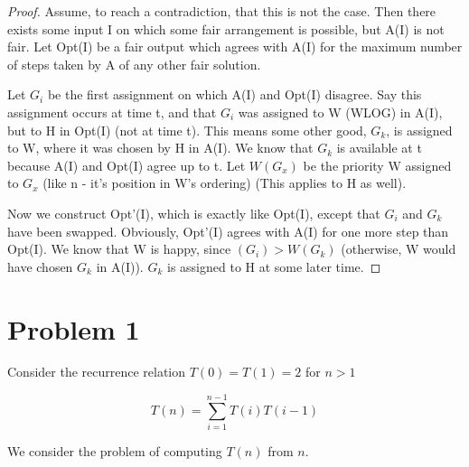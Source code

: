 \documentclass{article}
\providecommand{\prob}[1]{\section*{Problem #1}}
\begin{document}
	\begin{proof}
		Assume, to reach a contradiction, that this is not the case.
		Then there exists some input I on which some fair arrangement is possible, but A(I) is not fair.
		Let Opt(I) be a fair output which agrees with A(I) for the maximum number of steps taken by A of any other fair solution.
		
		Let $G_i$ be the first assignment on which A(I) and Opt(I) disagree.
		Say this assignment occurs at time t, and that $G_i$ was assigned to W (WLOG) in A(I), but to H in Opt(I) (not at time t).
		This means some other good, $G_k$, is assigned to W, where it was chosen by H in A(I).
		We know that $G_k$ is available at t because A(I) and Opt(I) agree up to t.
		Let $W(G_x)$ be the priority W assigned to $G_x$ (like n - it's position in W's ordering) (This applies to H as well).
		
		Now we construct Opt'(I), which is exactly like Opt(I), except that $G_i$ and $G_k$ have been swapped.
		Obviously, Opt'(I) agrees with A(I) for one more step than Opt(I).
		We know that W is happy, since $(G_i) > W(G_k)$ (otherwise, W would have chosen $G_k$ in A(I)).
		$G_k$ is assigned to H at some later time.
		
	\end{proof}


	\prob{1}
	Consider the recurrence relation $T(0) = T(1) = 2$ for $n > 1$
	
	\[ T(n) = \sum_{i=1}^{n-1} T(i)T(i-1) \]
	
	We consider the problem of computing $T(n)$ from $n$.
	
\end{document}
